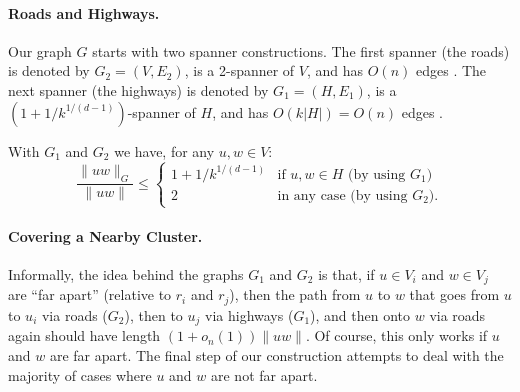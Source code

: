 \documentclass{patmorin}
\begin{document}
\begin{figure}
  \begin{minipage}{.47\textwidth}
  \end{minipage}%
  \hspace{.06\textwidth}
  \begin{minipage}{.47\textwidth}
  \end{minipage}
\end{figure}

\paragraph{Roads and Highways.}

Our graph $G$ starts with two spanner constructions.
The first spanner (the roads) is denoted by
$G_2=(V,E_2)$, is a 2-spanner of $V$, and has $O(n)$ edges
\cite{callahan.kosaraju:faster,salowe:constructing,vaidya:sparse}.
The next spanner (the highways) is denoted by $G_1=(H,E_1)$, is a
$(1+1/k^{1/(d-1)})$-spanner of $H$, and has $O(k|H|)=O(n)$ edges
\cite{carmi.smid:optimal,ruppert.seidel:approximating}.

With $G_1$ and $G_2$ we have, for any $u,w\in V$:
\[
   \frac{\|uw\|_G}{\|uw\|} \le \begin{cases}
         1+1/k^{1/(d-1)} & \text{if $u,w\in H$ (by using $G_1$)} \\
         2 & \text{in any case (by using $G_2$).}
       \end{cases}
\]

\paragraph{Covering a Nearby Cluster.}

Informally, the idea behind the graphs $G_1$ and $G_2$ is that, if
$u\in V_i$ and $w\in V_j$ are ``far apart'' (relative to $r_i$
and $r_j$), then the path from $u$ to $w$ that goes from $u$ to $u_i$
via roads ($G_2$), then to $u_j$ via highways ($G_1$), and then onto
$w$ via roads again should have length $(1+o_n(1))\|uw\|$.  Of course,
this only works if $u$ and $w$ are far apart.  The final step of
our construction attempts to deal with the majority of cases where $u$
and $w$ are not far apart.
\end{document}
